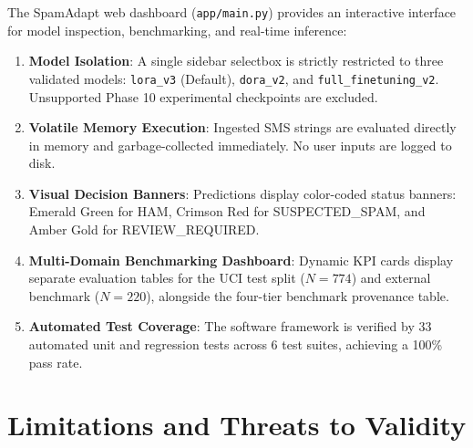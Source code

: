 \documentclass[conference]{IEEEtran}
\begin{document}
The SpamAdapt web dashboard (\texttt{app/main.py}) provides an interactive interface for model inspection, benchmarking, and real-time inference:
\begin{enumerate}
    \item \textbf{Model Isolation}: A single sidebar selectbox is strictly restricted to three validated models: \texttt{lora\_v3} (Default), \texttt{dora\_v2}, and \texttt{full\_finetuning\_v2}. Unsupported Phase 10 experimental checkpoints are excluded.
    \item \textbf{Volatile Memory Execution}: Ingested SMS strings are evaluated directly in memory and garbage-collected immediately. No user inputs are logged to disk.
    \item \textbf{Visual Decision Banners}: Predictions display color-coded status banners: Emerald Green for HAM, Crimson Red for SUSPECTED\_SPAM, and Amber Gold for REVIEW\_REQUIRED.
    \item \textbf{Multi-Domain Benchmarking Dashboard}: Dynamic KPI cards display separate evaluation tables for the UCI test split ($N=774$) and external benchmark ($N=220$), alongside the four-tier benchmark provenance table.
    \item \textbf{Automated Test Coverage}: The software framework is verified by 33 automated unit and regression tests across 6 test suites, achieving a 100\% pass rate.
\end{enumerate}

\section{Limitations and Threats to Validity}
\label{sec:limitations}
\end{document}
